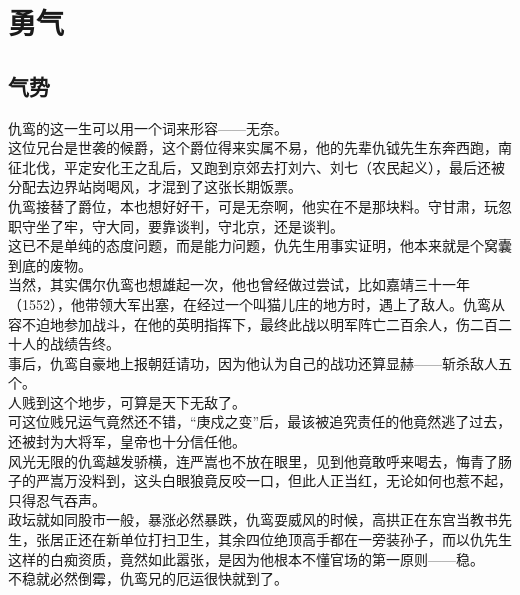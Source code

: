 \section{勇气}
\ifnum{}
	\begin{multicols}{\theparacolNo}
\fi
\subsection{气势}
仇鸾的这一生可以用一个词来形容——无奈。\\

这位兄台是世袭的候爵，这个爵位得来实属不易，他的先辈仇钺先生东奔西跑，南征北伐，平定安化王之乱后，又跑到京郊去打刘六、刘七（农民起义），最后还被分配去边界站岗喝风，才混到了这张长期饭票。\\

仇鸾接替了爵位，本也想好好干，可是无奈啊，他实在不是那块料。守甘肃，玩忽职守坐了牢，守大同，要靠谈判，守北京，还是谈判。\\

这已不是单纯的态度问题，而是能力问题，仇先生用事实证明，他本来就是个窝囊到底的废物。\\

当然，其实偶尔仇鸾也想雄起一次，他也曾经做过尝试，比如嘉靖三十一年（1552），他带领大军出塞，在经过一个叫猫儿庄的地方时，遇上了敌人。仇鸾从容不迫地参加战斗，在他的英明指挥下，最终此战以明军阵亡二百余人，伤二百二十人的战绩告终。\\

事后，仇鸾自豪地上报朝廷请功，因为他认为自己的战功还算显赫——斩杀敌人五个。\\

人贱到这个地步，可算是天下无敌了。\\

可这位贱兄运气竟然还不错，“庚戍之变”后，最该被追究责任的他竟然逃了过去，还被封为大将军，皇帝也十分信任他。\\

风光无限的仇鸾越发骄横，连严嵩也不放在眼里，见到他竟敢呼来喝去，悔青了肠子的严嵩万没料到，这头白眼狼竟反咬一口，但此人正当红，无论如何也惹不起，只得忍气吞声。\\

政坛就如同股市一般，暴涨必然暴跌，仇鸾耍威风的时候，高拱正在东宫当教书先生，张居正还在新单位打扫卫生，其余四位绝顶高手都在一旁装孙子，而以仇先生这样的白痴资质，竟然如此嚣张，是因为他根本不懂官场的第一原则——稳。\\

不稳就必然倒霉，仇鸾兄的厄运很快就到了。\\


\end{multicols}
